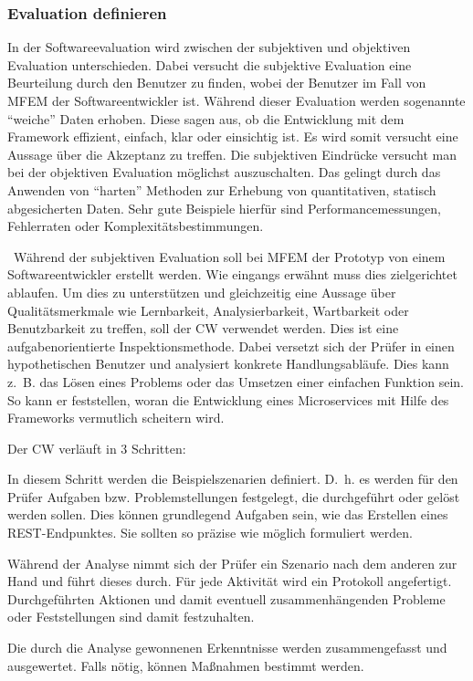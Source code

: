 \subsubsection{Evaluation definieren}\label{Evaluation_definieren}

In der Softwareevaluation wird zwischen der subjektiven und objektiven Evaluation unterschieden\cite{Hegner2016}.
Dabei versucht die subjektive Evaluation eine Beurteilung durch den Benutzer zu finden, wobei der Benutzer im Fall von \ac{MFEM} der Softwareentwickler ist. Während dieser Evaluation werden sogenannte \enquote{weiche} Daten erhoben. Diese sagen aus, ob die Entwicklung mit dem Framework effizient, einfach, klar oder einsichtig ist. Es wird somit versucht eine Aussage über die Akzeptanz zu treffen.
Die subjektiven Eindrücke versucht man bei der objektiven Evaluation möglichst auszuschalten. Das gelingt durch das Anwenden von \enquote{harten} Methoden zur Erhebung von quantitativen, statisch abgesicherten Daten\cite{Hegner2016}. Sehr gute Beispiele hierfür sind Performancemessungen, Fehlerraten oder Komplexitätsbestimmungen.  

\
Während der subjektiven Evaluation soll bei \ac{MFEM} der Prototyp von einem Softwareentwickler erstellt werden. Wie eingangs erwähnt muss dies zielgerichtet ablaufen. Um dies zu unterstützen und gleichzeitig eine Aussage über Qualitätsmerkmale wie Lernbarkeit, Analysierbarkeit, Wartbarkeit oder Benutzbarkeit zu treffen, soll der \ac{CW} verwendet werden. Dies ist eine aufgabenorientierte Inspektionsmethode\cite{Hegner2016}. Dabei versetzt sich der Prüfer in einen hypothetischen Benutzer und analysiert konkrete Handlungsabläufe. Dies kann z.~B. das Lösen eines Problems oder das Umsetzen einer einfachen Funktion sein. 
So kann er feststellen, woran die Entwicklung eines Microservices mit Hilfe des Frameworks vermutlich scheitern wird.

Der \ac{CW} verläuft in 3 Schritten\cite{Hegner2016}:

\begin{description}[leftmargin=!,labelwidth=\widthof{\bfseries Input definieren}]
	\item[1. Vorbereitung]
	In diesem Schritt werden die Beispielszenarien definiert. D.~h. es werden für den Prüfer Aufgaben bzw. Problemstellungen festgelegt, die durchgeführt oder gelöst werden sollen. Dies können grundlegend Aufgaben sein, wie das Erstellen eines \ac{REST}-Endpunktes. Sie sollten so präzise wie möglich formuliert werden.
	\item[2. Analyse]
	Während der Analyse nimmt sich der Prüfer ein Szenario nach dem anderen zur Hand und führt dieses durch. Für jede Aktivität wird ein Protokoll angefertigt. Durchgeführten Aktionen und damit eventuell zusammenhängenden Probleme oder Feststellungen sind damit festzuhalten.
	\item[3. Follow Up]
	Die durch die Analyse gewonnenen Erkenntnisse werden zusammengefasst und ausgewertet. Falls nötig, können Maßnahmen bestimmt werden.
\end{description}

